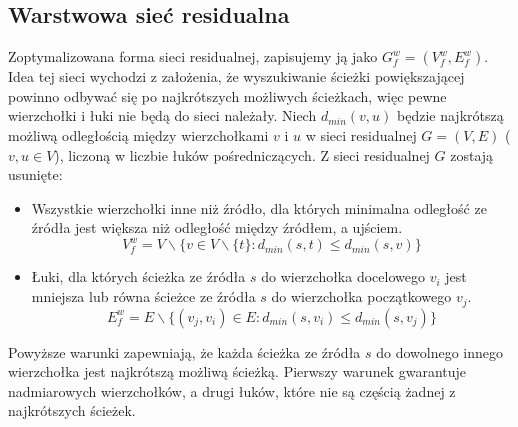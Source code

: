 \subsection{Warstwowa sieć residualna}\label{ssec:WSR}
Zoptymalizowana forma sieci residualnej, zapisujemy ją jako $ G_f^w=(V_f^w,E_f^w) $. Idea tej sieci wychodzi z założenia, że wyszukiwanie ścieżki powiększającej powinno odbywać się po najkrótszych możliwych ścieżkach, więc pewne wierzchołki i łuki nie będą do sieci należały. Niech $ d_{min}(v,u) $ będzie najkrótszą możliwą odległością między wierzchołkami $ v $ i $ u $ w sieci residualnej $ G=(V,E) $ ($ v,u\in V $), liczoną w liczbie łuków pośredniczących. Z sieci residualnej $ G $ zostają usunięte:
\begin{itemize}
	\item Wszystkie wierzchołki inne niż źródło, dla których minimalna odległość ze źródła jest większa niż odległość między źródłem, a ujściem.
	$$ V_f^w=V\backslash\{v\in V\backslash\{t\} : d_{min}(s,t)\le d_{min}(s,v)\} $$
	\item Łuki, dla których ścieżka ze źródła $ s $ do wierzchołka docelowego $ v_i $ jest mniejsza lub równa ścieżce ze źródła $ s $ do wierzchołka początkowego $ v_j $.
	$$ E_f^w=E\backslash\{(v_j,v_i)\in E : d_{min}(s,v_i)\le d_{min}(s,v_j)\} $$	
\end{itemize}
Powyższe warunki zapewniają, że każda ścieżka ze źródła $ s $ do dowolnego innego wierzchołka jest najkrótszą możliwą ścieżką. Pierwszy warunek gwarantuje nadmiarowych wierzchołków, a drugi łuków, które nie są częścią żadnej z najkrótszych ścieżek.
